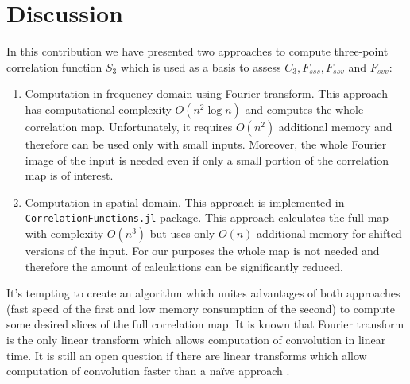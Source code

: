\documentclass[reprint,amsmath,amssymb,aps,pre,showkeys,showpacs]{revtex4-1}
\newcommand{\code}[1]{\colorbox{light-gray}{\texttt{#1}}}
\begin{document}
\section{Discussion}
\label{sec:discussion}
In this contribution we have presented two approaches to compute three-point correlation
function $S_3$ which is used as a basis to assess $C_3, F_{sss}, F_{ssv}$ and $F_{svv}$:
\begin{enumerate}
\item Computation in frequency domain using Fourier transform. This approach has
  computational complexity $O(n^2 \log n)$ and computes the whole correlation
  map. Unfortunately, it requires $O(n^2)$ additional memory and therefore can
  be used only with small inputs. Moreover, the whole Fourier image of the input
  is needed even if only a small portion of the correlation map is of interest.
\item Computation in spatial domain. This approach is implemented in
  \code{CorrelationFunctions.jl} package. This approach calculates the full map with
  complexity $O(n^3)$ but uses only $O(n)$ additional memory for shifted
  versions of the input. For our purposes the whole map is not needed and
  therefore the amount of calculations can be significantly reduced.
\end{enumerate}
It's tempting to create an algorithm which unites advantages of both approaches
(fast speed of the first and low memory consumption of the second) to
compute some desired slices of the full correlation map. It is known that Fourier
transform is the only linear transform which allows computation of convolution
in linear time. It is still an open question if there are linear transforms which
allow computation of convolution faster than a naïve approach
\cite{stone2008uniqueness,stone1998convolution}.
\end{document}

